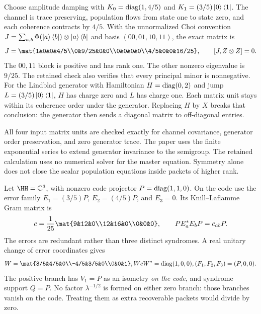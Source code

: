 Choose amplitude damping with $K_0=\operatorname{diag}(1,4/5)$ and $K_1=(3/5)\left|0\right\rangle\left\langle1\right|$. The channel is trace preserving, population flows from state one to state zero, and each coherence contracts by $4/5$.
With the unnormalized Choi convention $J=\sum_{a,b}\Phi(\left|a\right\rangle\left\langle b\right|)\otimes\left|a\right\rangle\left\langle b\right|$ and basis $(00,01,10,11)$, the exact matrix is
\[
J=\mat{1&0&0&4/5\\0&9/25&0&0\\0&0&0&0\\4/5&0&0&16/25},
\qquad [J,Z\otimes Z]=0.
\]
The $00,11$ block is positive and has rank one. The other nonzero eigenvalue is $9/25$. The retained check also verifies that every principal minor is nonnegative.
For the Lindblad generator with Hamiltonian $H=\operatorname{diag}(0,2)$ and jump $L=(3/5)\left|0\right\rangle\left\langle1\right|$, $H$ has charge zero and $L$ has charge one. Each matrix unit stays within its coherence order under the generator. Replacing $H$ by $X$ breaks that conclusion: the generator then sends a diagonal matrix to off-diagonal entries.

All four input matrix units are checked exactly for channel covariance, generator order preservation, and zero generator trace. The paper uses the finite exponential series to extend generator invariance to the semigroup. The retained calculation uses no numerical solver for the master equation. Symmetry alone does not close the scalar population equations inside packets of higher rank.

Let $\HH=\CC^3$, with nonzero code projector $P=\operatorname{diag}(1,1,0)$. On the code use the error family $E_1=(3/5)P$, $E_2=(4/5)P$, and $E_3=0$. Its Knill--Laflamme Gram matrix is
\[
c=\frac1{25}\mat{9&12&0\\12&16&0\\0&0&0},
\qquad PE_a^*E_bP=c_{ab}P.
\]
The errors are redundant rather than three distinct syndromes. A real unitary change of error coordinates gives
\[
W=\mat{3/5&4/5&0\\-4/5&3/5&0\\0&0&1},
\quad WcW^*=\diag(1,0,0),
\quad(F_1,F_2,F_3)=(P,0,0).
\]
The positive branch has $V_1=P$ as an isometry \emph{on the code}, and syndrome support $Q=P$. No factor $\lambda^{-1/2}$ is formed on either zero branch: those branches vanish on the code. Treating them as extra recoverable packets would divide by zero.

